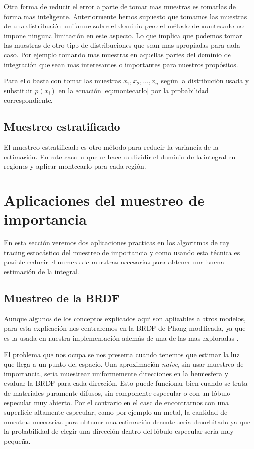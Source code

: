 Otra forma de reducir el error a parte de tomar mas muestras es tomarlas de forma mas inteligente. Anteriormente hemos supuesto que tomamos las muestras de una distribución uniforme sobre el dominio pero el método de montecarlo no impone ninguna limitación en este aspecto. Lo que implica que podemos tomar las muestras de otro tipo de distribuciones que sean mas apropiadas para cada caso. Por ejemplo tomando mas muestras en aquellas partes del dominio de integración que sean mas interesantes o importantes para nuestros propósitos.

\medskip

Para ello basta con tomar las muestras $x_1, x_2, ..., x_n$ según la distribución usada y substituir $p(x_i)$ en la ecuación \ref{eq:montecarlo} por la probabilidad correspondiente.

\subsection{Muestreo estratificado}

El muestreo estratificado es otro método para reducir la variancia de la estimación. En este caso lo que se hace es dividir el dominio de la integral en regiones y aplicar montecarlo para cada región. 

\clearpage

\section{Aplicaciones del muestreo de importancia}

En esta sección veremos dos aplicaciones practicas en los algoritmos de ray tracing estocástico del muestreo de importancia y como usando esta técnica es posible reducir el numero de muestras necesarias para obtener una buena estimación de la integral.


\subsection{Muestreo de la BRDF}
\label{muestreo_brdf}
Aunque algunos de los conceptos explicados aquí son aplicables a otros modelos, para esta explicación nos centraremos en la BRDF de Phong modificada, ya que es la usada en nuestra implementación además de una de las mas exploradas \cite{Lafortune1994}.



\medskip

El problema que nos ocupa se nos presenta cuando tenemos que estimar la luz que llega a un punto del espacio. Una aproximación \emph{naive}, sin usar muestreo de importancia, seria muestrear uniformemente direcciones en la hemiesfera y evaluar la BRDF para cada dirección. Esto puede funcionar bien cuando se trata de materiales puramente difusos, sin componente especular o con un lóbulo especular muy abierto. Por el contrario en el caso de encontrarnos con una superficie altamente especular, como por ejemplo un metal, la cantidad de muestras necesarias para obtener una estimación decente seria desorbitada ya que la probabilidad de elegir una dirección dentro del lóbulo especular seria muy pequeña.

